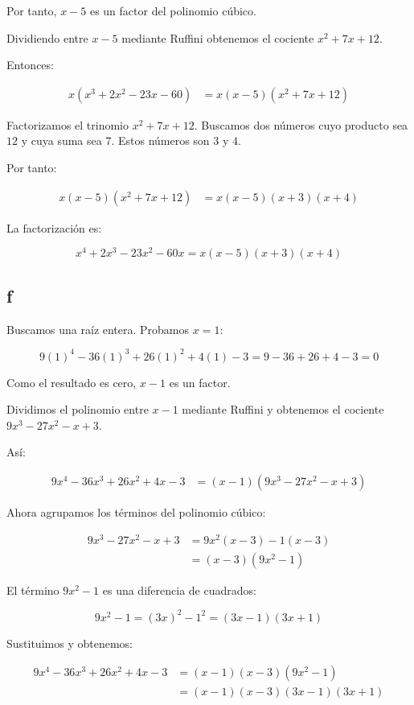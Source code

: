 \documentclass[a4paper,12pt]{article}
\begin{document}
Por tanto, $x-5$ es un factor del polinomio cúbico.

Dividiendo entre $x-5$ mediante Ruffini obtenemos
el cociente $x^2+7x+12$.

Entonces:

\begin{align*}
x(x^3+2x^2-23x-60)
&=x(x-5)(x^2+7x+12)
\end{align*}

Factorizamos el trinomio $x^2+7x+12$.
Buscamos dos números cuyo producto sea $12$
y cuya suma sea $7$. Estos números son $3$ y $4$.

Por tanto:

\begin{align*}
x(x-5)(x^2+7x+12)
&=x(x-5)(x+3)(x+4)
\end{align*}

La factorización es:

\[
\boxed{
x^4+2x^3-23x^2-60x=x(x-5)(x+3)(x+4)
}
\]

\subsection*{f}

Buscamos una raíz entera. Probamos $x=1$:

\[
9(1)^4-36(1)^3+26(1)^2+4(1)-3
=9-36+26+4-3=0
\]

Como el resultado es cero, $x-1$ es un factor.

Dividimos el polinomio entre $x-1$ mediante Ruffini
y obtenemos el cociente
$9x^3-27x^2-x+3$.

Así:

\begin{align*}
9x^4-36x^3+26x^2+4x-3
&=(x-1)(9x^3-27x^2-x+3)
\end{align*}

Ahora agrupamos los términos del polinomio cúbico:

\begin{align*}
9x^3-27x^2-x+3
&=9x^2(x-3)-1(x-3)\\
&=(x-3)(9x^2-1)
\end{align*}

El término $9x^2-1$ es una diferencia de cuadrados:

\[
9x^2-1=(3x)^2-1^2=(3x-1)(3x+1)
\]

Sustituimos y obtenemos:

\begin{align*}
9x^4-36x^3+26x^2+4x-3
&=(x-1)(x-3)(9x^2-1)\\
&=(x-1)(x-3)(3x-1)(3x+1)
\end{align*}
\end{document}
